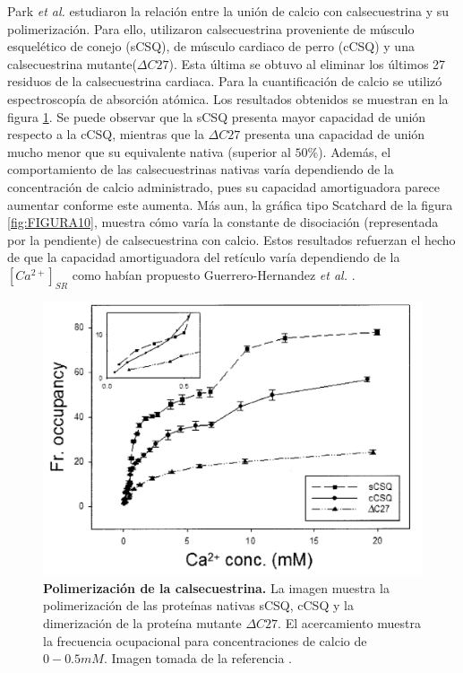 \documentclass[draft]{article}
\newcommand{\Cal}{[Ca^{2+}]_{SR}}
\newcommand{\al}{\textit{et al.} }
\begin{document}
Park \al \cite{Park2004a} estudiaron la relación entre la unión de calcio con calsecuestrina y su polimerización. Para ello, utilizaron calsecuestrina proveniente de músculo esquelético de conejo (sCSQ), de músculo cardiaco de perro (cCSQ) y una calsecuestrina mutante($\Delta C27$). Esta última se obtuvo al eliminar los últimos 27 residuos de la calsecuestrina cardiaca. Para la cuantificación de calcio se utilizó espectroscopía de absorción atómica. Los resultados obtenidos se muestran en la figura \ref{fig:FIGURA9}. Se puede observar que la sCSQ presenta mayor capacidad de unión respecto a la cCSQ, mientras que la $\Delta C27$ presenta una capacidad de unión mucho menor que su equivalente nativa (superior al $50\%$). Además, el comportamiento de las calsecuestrinas nativas varía dependiendo de la concentración de calcio administrado, pues su capacidad amortiguadora parece aumentar conforme este aumenta. Más aun, la gráfica tipo Scatchard de la figura \ref{fig:FIGURA10}, muestra cómo varía la constante de disociación (representada por la pendiente) de calsecuestrina con calcio. Estos resultados refuerzan el hecho de que la capacidad amortiguadora del retículo varía dependiendo de la $\Cal$ como habían propuesto Guerrero-Hernandez \al \cite{Guerrero-Hernandez2010}. \\

\begin{figure}[h]
	\centering
	\includegraphics{FIGURA9}
	\caption{\textbf{Polimerización de la calsecuestrina.} La imagen muestra la polimerización de las proteínas nativas sCSQ, cCSQ y la dimerización de la proteína mutante $\Delta C27$. El acercamiento muestra la frecuencia ocupacional para concentraciones de calcio de $0 - 0.5 mM$. Imagen tomada de la referencia \cite{Park2004a}.}
	\label{fig:FIGURA9}
\end{figure}
\end{document}
